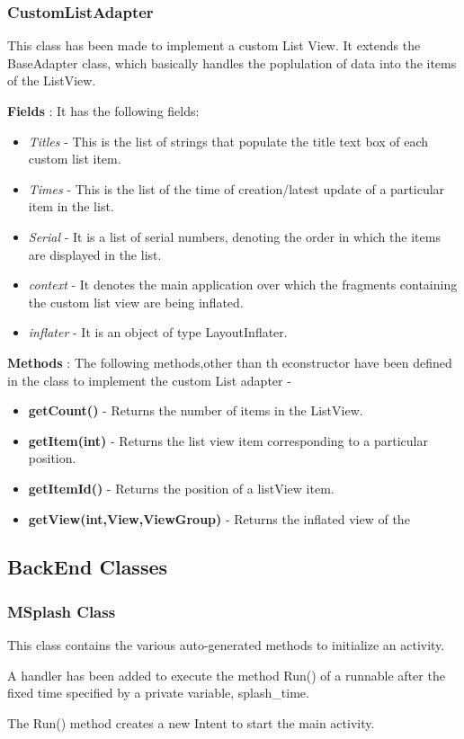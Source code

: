 \documentclass{article}
\begin{document}
\subsubsection{CustomListAdapter}
\par\noindent This class has been made to implement a custom List View. It extends the BaseAdapter class, which basically handles the poplulation of data into the items of the ListView.
\par\noindent \textbf{Fields} : It has the following fields:
\begin{itemize}
\item \textit{Titles} - This is the list of strings that populate the title text box of each custom list item.
\item \textit{Times} - This is the list of the time of creation/latest update of a particular item in the list.
\item \textit{Serial} - It is a list of serial numbers, denoting the order in which the items are displayed in the list.

\item \textit{context} - It denotes the main application over which the fragments containing the custom list view are being inflated.

\item \textit{inflater} - It is an object of type LayoutInflater.
\end{itemize}

\par\noindent \textbf{Methods} : The following methods,other than th econstructor have been defined in the class to implement the custom List adapter -
\begin{itemize}
\item \textbf{getCount()} - Returns the number of items in the ListView.
\item \textbf{getItem(int)} - Returns the list view item corresponding to a particular position.
\item \textbf{getItemId()} - Returns the position of a listView item.
\item \textbf{getView(int,View,ViewGroup)} - Returns the inflated view of the 
\end{itemize}

\subsection{BackEnd Classes}
\subsubsection{MSplash Class}
\par\noindent This class contains the various auto-generated methods to initialize an activity.
\par\noindent A handler has been added to execute the method Run() of a runnable after the fixed time specified by a private variable, splash\_time.
\par\noindent The Run() method creates a new Intent to start the main activity.
\end{document}
